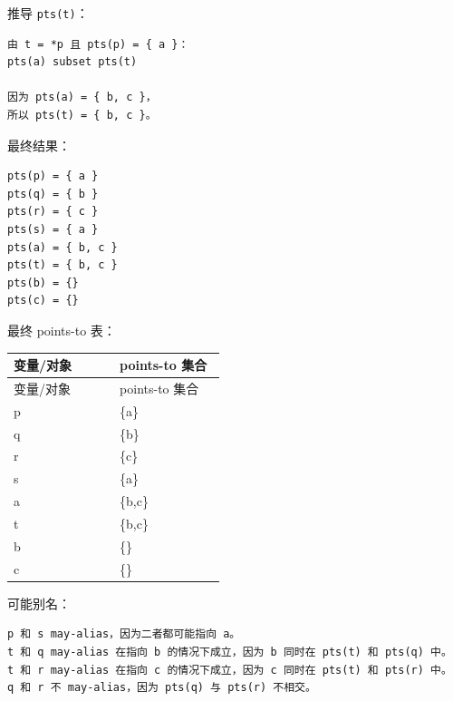 \documentclass[UTF8]{ctexart}
\begin{document}
推导 \texttt{pts(t)}：

\begin{Verbatim}[fontsize=\small,breaklines=true]
由 t = *p 且 pts(p) = { a }：
pts(a) subset pts(t)

因为 pts(a) = { b, c }，
所以 pts(t) = { b, c }。
\end{Verbatim}

最终结果：

\begin{Verbatim}[fontsize=\small,breaklines=true]
pts(p) = { a }
pts(q) = { b }
pts(r) = { c }
pts(s) = { a }
pts(a) = { b, c }
pts(t) = { b, c }
pts(b) = {}
pts(c) = {}
\end{Verbatim}

最终 points-to 表：

\begin{longtable}{|p{0.47\linewidth}|p{0.47\linewidth}|}
\hline
变量/对象 & points-to 集合 \\
\hline
\endfirsthead
变量/对象 & points-to 集合 \\
\hline
\endhead
p & \{a\} \\
\hline
q & \{b\} \\
\hline
r & \{c\} \\
\hline
s & \{a\} \\
\hline
a & \{b,c\} \\
\hline
t & \{b,c\} \\
\hline
b & \{\} \\
\hline
c & \{\} \\
\hline
\end{longtable}


可能别名：

\begin{Verbatim}[fontsize=\small,breaklines=true]
p 和 s may-alias，因为二者都可能指向 a。
t 和 q may-alias 在指向 b 的情况下成立，因为 b 同时在 pts(t) 和 pts(q) 中。
t 和 r may-alias 在指向 c 的情况下成立，因为 c 同时在 pts(t) 和 pts(r) 中。
q 和 r 不 may-alias，因为 pts(q) 与 pts(r) 不相交。
\end{Verbatim}
\end{document}
